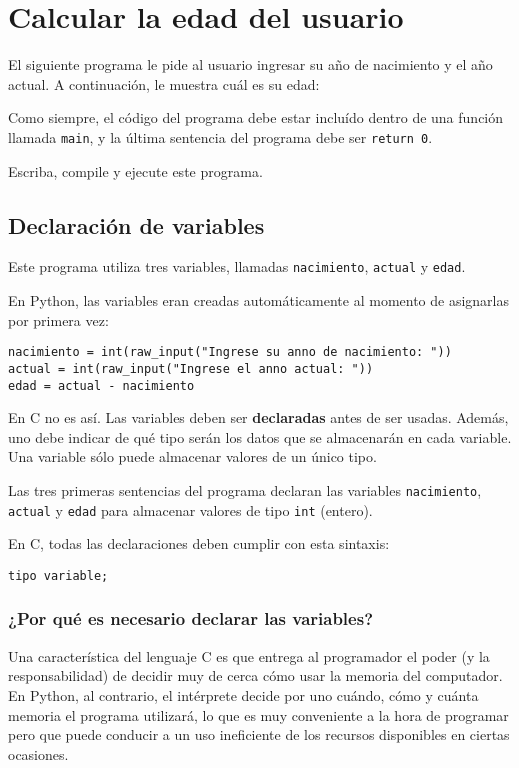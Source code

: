 \section{Calcular la edad del usuario}

El siguiente programa le pide al usuario ingresar su año de nacimiento y
el año actual. A continuación, le muestra cuál es su edad:

Como siempre, el código del programa debe estar incluído dentro de una
función llamada \lstinline!main!, y la última sentencia del programa
debe ser \lstinline!return 0!.

Escriba, compile y ejecute este programa.

\subsection{Declaración de variables}

Este programa utiliza tres variables, llamadas \lstinline!nacimiento!,
\lstinline!actual! y \lstinline!edad!.

En Python, las variables eran creadas automáticamente al momento de
asignarlas por primera vez:

\begin{lstlisting}
nacimiento = int(raw_input("Ingrese su anno de nacimiento: "))
actual = int(raw_input("Ingrese el anno actual: "))
edad = actual - nacimiento
\end{lstlisting}

En C no es así. Las variables deben ser \textbf{declaradas} antes de ser
usadas. Además, uno debe indicar de qué tipo serán los datos que se
almacenarán en cada variable. Una variable sólo puede almacenar valores
de un único tipo.

Las tres primeras sentencias del programa declaran las variables
\lstinline!nacimiento!, \lstinline!actual! y \lstinline!edad! para
almacenar valores de tipo \lstinline!int! (entero).

En C, todas las declaraciones deben cumplir con esta sintaxis:

\begin{lstlisting}
tipo variable;
\end{lstlisting}

\subsubsection{¿Por qué es necesario declarar las variables?}

Una característica del lenguaje C es que entrega al programador el poder
(y la responsabilidad) de decidir muy de cerca cómo usar la memoria del
computador. En Python, al contrario, el intérprete decide por uno
cuándo, cómo y cuánta memoria el programa utilizará, lo que es muy
conveniente a la hora de programar pero que puede conducir a un uso
ineficiente de los recursos disponibles en ciertas ocasiones.

